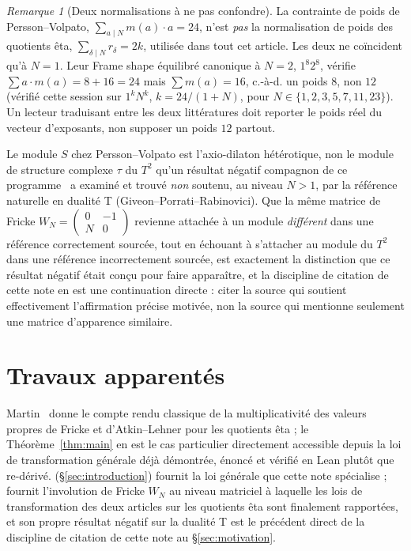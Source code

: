 \documentclass[11pt, a4paper]{article}
\newcommand{\lean}[1]{\ifmmode\text{\ttfamily\detokenize{#1}}\else{\ttfamily\detokenize{#1}}\fi}
\theoremstyle{remark}
\newtheorem{remark}[theorem]{Remarque}
\begin{document}
\begin{remark}[Deux normalisations à ne pas confondre]\label{rem:normalization}
La contrainte de poids de Persson--Volpato, $\sum_{a\mid N}m(a)\cdot a=24$, n'est \emph{pas} la
normalisation de poids des quotients êta, $\sum_{\delta\mid N}r_\delta=2k$, utilisée dans tout cet
article. Les deux ne coïncident qu'à $N=1$. Leur Frame shape équilibré canonique à $N=2$,
$1^8 2^8$, vérifie $\sum a\cdot m(a) = 8+16=24$ mais $\sum m(a)=16$, c.-à-d. un poids $8$, non
$12$ (vérifié cette session sur $1^k N^k$, $k=24/(1+N)$, pour $N\in\{1,2,3,5,7,11,23\}$). Un
lecteur traduisant entre les deux littératures doit reporter le poids réel du vecteur
d'exposants, non supposer un poids $12$ partout.
\end{remark}

Le module $S$ chez Persson--Volpato est l'axio-dilaton hétérotique, non le module de structure
complexe $\tau$ du $T^2$ qu'un résultat négatif compagnon de ce
programme~\cite{Fricke2026} a examiné et trouvé \emph{non} soutenu, au niveau $N>1$, par la
référence naturelle en dualité T (Giveon--Porrati--Rabinovici). Que la même matrice de Fricke
$W_N=\left(\begin{smallmatrix}0&-1\\N&0\end{smallmatrix}\right)$ revienne attachée à un module
\emph{différent} dans une référence correctement sourcée, tout en échouant à s'attacher au
module du $T^2$ dans une référence incorrectement sourcée, est exactement la distinction que ce
résultat négatif était conçu pour faire apparaître, et la discipline de citation de cette note en
est une continuation directe : citer la source qui soutient effectivement l'affirmation précise
motivée, non la source qui mentionne seulement une matrice d'apparence similaire.

\section{Travaux apparentés}\label{sec:related}

Martin~\cite{Martin1996} donne le compte rendu classique de la multiplicativité des valeurs
propres de Fricke et d'Atkin--Lehner pour les quotients êta ; le Théorème~\ref{thm:main} en est
le cas particulier directement accessible depuis la loi de transformation générale déjà
démontrée, énoncé et vérifié en Lean plutôt que re-dérivé. \lean{etaQuotient_fricke}
(\S\ref{sec:introduction})\cite{EtaQuotients2026} fournit la loi générale que cette note
spécialise ; \cite{Fricke2026} fournit l'involution de Fricke $W_N$ au niveau matriciel à laquelle
les lois de transformation des deux articles sur les quotients êta sont finalement rapportées, et
son propre résultat négatif sur la dualité T est le précédent direct de la discipline de citation
de cette note au \S\ref{sec:motivation}.
\end{document}
